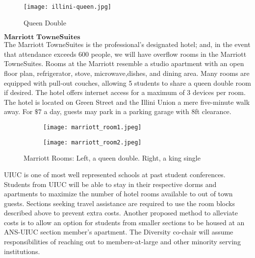 \begin{figure}[H]
	\centering
	\texttt{[image: illini-queen.jpg]}
	\caption{Queen Double}		
\end{figure} 

$\textbf{Marriott TowneSuites}$\\
The Marriott TowneSuites is the professional's designated hotel; and, in the event that attendance exceeds 600 people, we will have overflow rooms in the Marriott TowneSuites. Rooms at the Marriott resemble a studio apartment with an open floor plan, refrigerator, stove, microwave,dishes, and dining area. Many rooms are equipped with pull-out couches, allowing 5 students to share a queen double room if desired. The hotel offers internet access for a maximum of 3 devices per room. The hotel is located on Green Street and the Illini Union a mere five-minute walk away. For $\$7$ a day, guests may park in a parking garage with 8ft clearance.\\
\begin{figure}[H]
	\centering
	\begin{subfigure}{0.5\textwidth}
		\centering
		\texttt{[image: marriott\_room1.jpeg]}
	\end{subfigure}%
	\begin{subfigure}{0.5\textwidth}
		\centering
		\texttt{[image: marriott\_room2.jpeg]}
	\end{subfigure}
	\caption{Marriott Rooms: Left, a queen double. Right, a king single}		
\end{figure} 

UIUC is one of most well represented schools at past student conferences. Students from UIUC will be able to stay in their respective dorms and apartments to maximize the number of hotel rooms available to out of town guests. Sections seeking travel assistance are required to use the room blocks described above to prevent extra costs. Another proposed method to alleviate costs is to allow an option for students from smaller sections to be housed at an ANS-UIUC section member's apartment. The Diversity co-chair will assume responsibilities of reaching out to members-at-large and other minority serving institutions. 


\begin{table}
\caption{Cost of Hotels}
\label{table:hotels}
	\centering
\end{table}

